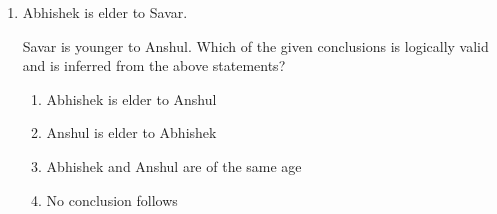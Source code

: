 \documentclass[journal]{IEEEtran}
\begin{document}
\begin{enumerate}
\begin{multicols}{4}
			\begin{enumerate}
   \item 5
\item 10
\item15
\item 30
\end{enumerate}
		\end{multicols}
  \item   Abhishek is elder to Savar.

Savar is younger to Anshul.
Which of the given conclusions is logically valid and is inferred from the above statements?
 
			\begin{enumerate}
   \item Abhishek is elder to Anshul
\item Anshul is elder to Abhishek
\item  Abhishek and Anshul are of the same age
\item No conclusion follows
  \end{enumerate}
		
 \end{enumerate}
\end{document}
